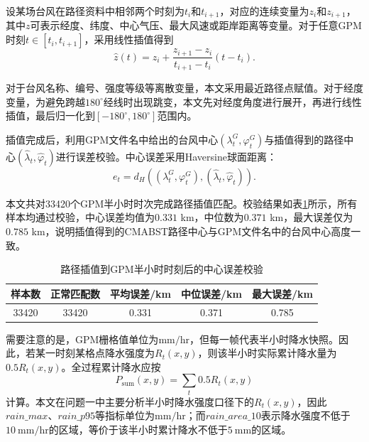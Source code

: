 \documentclass[UTF8,a4paper,zihao=5,fontset=fandol]{ctexart}
\numberwithin{equation}{section}
\numberwithin{figure}{section}
\numberwithin{table}{section}
\begin{document}
设某场台风在路径资料中相邻两个时刻为$t_i$和$t_{i+1}$，对应的连续变量为$z_i$和$z_{i+1}$，其中$z$可表示经度、纬度、中心气压、最大风速或距岸距离等变量。对于任意GPM时刻$t\in[t_i,t_{i+1}]$，采用线性插值得到
\begin{equation}
    \hat{z}(t)=z_i+\frac{z_{i+1}-z_i}{t_{i+1}-t_i}(t-t_i).
\end{equation}

对于台风名称、编号、强度等级等离散变量，本文采用最近路径点赋值。对于经度变量，为避免跨越$180^\circ$经线时出现跳变，本文先对经度角度进行展开，再进行线性插值，最后归一化到$[-180^\circ,180^\circ]$范围内。

插值完成后，利用GPM文件名中给出的台风中心$(\lambda_t^G,\varphi_t^G)$与插值得到的路径中心$(\hat{\lambda}_t,\hat{\varphi}_t)$进行误差校验。中心误差采用Haversine球面距离：
\begin{equation}
    e_t=d_H\left((\lambda_t^G,\varphi_t^G),(\hat{\lambda}_t,\hat{\varphi}_t)\right).
\end{equation}

本文共对33420个GPM半小时时次完成路径插值匹配。校验结果如表\ref{tab:interp_quality_problem1}所示，所有样本均通过校验，中心误差均值为$0.331$ km，中位数为$0.371$ km，最大误差仅为$0.785$ km，说明插值得到的CMABST路径中心与GPM文件名中的台风中心高度一致。

\begin{table}[htbp]
    \centering
    \caption{路径插值到GPM半小时时刻后的中心误差校验}
    \label{tab:interp_quality_problem1}
    \begin{tabular}{ccccc}
        \hline
        样本数 & 正常匹配数 & 平均误差/km & 中位误差/km & 最大误差/km \\
        \hline
        33420 & 33420 & 0.331 & 0.371 & 0.785 \\
        \hline
    \end{tabular}
\end{table}

需要注意的是，GPM栅格值单位为$\mathrm{mm/hr}$，但每一帧代表半小时降水快照。因此，若某一时刻某格点降水强度为$R_t(x,y)$，则该半小时实际累计降水量为$0.5R_t(x,y)$。全过程累计降水应按
\begin{equation}
    P_{\mathrm{sum}}(x,y)=\sum_t 0.5R_t(x,y)
\end{equation}
计算。本文在问题一中主要分析半小时降水强度口径下的$R_t(x,y)$，因此$rain\_max$、$rain\_p95$等指标单位为$\mathrm{mm/hr}$；而$rain\_area\_10$表示降水强度不低于$10\ \mathrm{mm/hr}$的区域，等价于该半小时累计降水不低于$5\ \mathrm{mm}$的区域。
\end{document}
